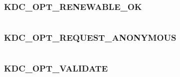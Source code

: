 \documentclass[letterpaper,10pt,english]{sphinxmanual}
\begin{document}
\subsubsection{KDC\_OPT\_RENEWABLE\_OK}
\label{appdev/refs/macros/KDC_OPT_RENEWABLE_OK::doc}\label{appdev/refs/macros/KDC_OPT_RENEWABLE_OK:kdc-opt-renewable-ok-data}\label{appdev/refs/macros/KDC_OPT_RENEWABLE_OK:kdc-opt-renewable-ok}

\begin{fulllineitems}
\label{appdev/refs/macros/KDC_OPT_RENEWABLE_OK:KDC_OPT_RENEWABLE_OK}
\end{fulllineitems}


\begin{tabulary}{\linewidth}{|L|L|}
\hline

 & 
\\
\hline\end{tabulary}



\subsubsection{KDC\_OPT\_REQUEST\_ANONYMOUS}
\label{appdev/refs/macros/KDC_OPT_REQUEST_ANONYMOUS:kdc-opt-request-anonymous}\label{appdev/refs/macros/KDC_OPT_REQUEST_ANONYMOUS:kdc-opt-request-anonymous-data}\label{appdev/refs/macros/KDC_OPT_REQUEST_ANONYMOUS::doc}

\begin{fulllineitems}
\label{appdev/refs/macros/KDC_OPT_REQUEST_ANONYMOUS:KDC_OPT_REQUEST_ANONYMOUS}
\end{fulllineitems}


\begin{tabulary}{\linewidth}{|L|L|}
\hline

 & 
\\
\hline\end{tabulary}



\subsubsection{KDC\_OPT\_VALIDATE}
\label{appdev/refs/macros/KDC_OPT_VALIDATE:kdc-opt-validate-data}\label{appdev/refs/macros/KDC_OPT_VALIDATE:kdc-opt-validate}\label{appdev/refs/macros/KDC_OPT_VALIDATE::doc}
\end{document}
